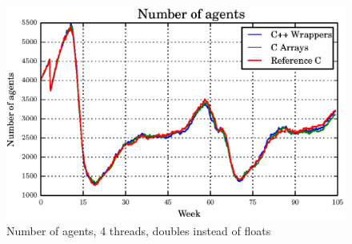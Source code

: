 \documentclass[12pt, a4paper]{report}
\begin{document}
\begin{appendices}
\begin{figure}[H]
  \begin{center}
    \includegraphics[width=\columnwidth]{graphs/ag-fixed-multi-double-comp.eps}
    \caption{Number of agents, 4 threads, doubles instead of floats}
    \label{fig:ag-fixed-multi-double-comp}
  \end{center}
\end{figure}

\end{appendices}
\end{document}
